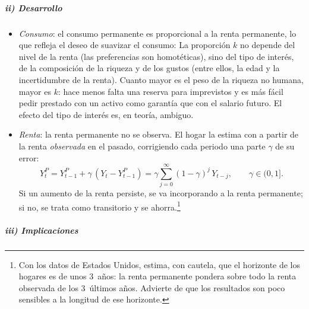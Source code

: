 \documentclass[11pt]{article}
\begin{document}
\subparagraph{ii) Desarrollo}

\begin{itemize}
\item \emph{Consumo}: el consumo permanente es proporcional a la renta permanente, lo que refleja el deseo de suavizar el consumo:
  La proporción $k$ no depende del nivel de la renta (las preferencias son homotéticas), sino del tipo de interés, de la composición de la riqueza y de los gustos (entre ellos, la edad y la incertidumbre de la renta). Cuanto mayor es el peso de la riqueza no humana, mayor es $k$: hace menos falta una reserva para imprevistos y es más fácil pedir prestado con un activo como garantía que con el salario futuro\nocite{Friedman1957}. El efecto del tipo de interés es, en teoría, ambiguo.
\item \emph{Renta}: la renta permanente no se observa. El hogar la estima con  a partir de la renta \emph{observada} en el pasado, corrigiendo cada periodo una parte $\gamma$ de su error:
  \begin{equation}
  Y^P_t=Y^P_{t-1}+\gamma\,(Y_t-Y^P_{t-1})=\gamma\sum_{j=0}^{\infty}(1-\gamma)^j\,Y_{t-j},\qquad \gamma\in(0,1].\label{eq:expectativas-adaptativas}
  \end{equation}
  Si un aumento de la renta persiste, se va incorporando a la renta permanente; si no, se trata como transitorio y se ahorra.\footnote{Con los datos de Estados Unidos, \textcite[p.~226]{Friedman1957} estima, con cautela, que el horizonte de los hogares es de unos 3~años: la renta permanente pondera sobre todo la renta observada de los 3~últimos años. Advierte de que los resultados son poco sensibles a la longitud de ese horizonte.}
\end{itemize}

\subparagraph{iii) Implicaciones}
\end{document}
